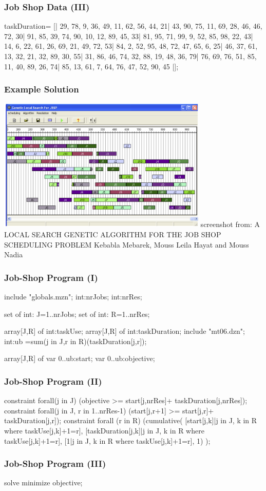 \begin{frame}[fragile]
  \frametitle{Job Shop Data (III)}
    \begin{semiverbatim}
taskDuration= [|
	29, 78,  9, 36, 49, 11, 62, 56, 44, 21|
	43, 90, 75, 11, 69, 28, 46, 46, 72, 30|
	91, 85, 39, 74, 90, 10, 12, 89, 45, 33|
	81, 95, 71, 99,  9, 52, 85, 98, 22, 43|
	14,  6, 22, 61, 26, 69, 21, 49, 72, 53|
	84,  2, 52, 95, 48, 72, 47, 65,  6, 25|
	46, 37, 61, 13, 32, 21, 32, 89, 30, 55|
	31, 86, 46, 74, 32, 88, 19, 48, 36, 79|
	76, 69, 76, 51, 85, 11, 40, 89, 26, 74|
	85, 13, 61,  7, 64, 76, 47, 52, 90, 45 |];
    \end{semiverbatim}
\end{frame}

\begin{frame}
  \frametitle{Example Solution}
  \includegraphics[width=10cm]{ft10}
  {\scriptsize screenshot from:
  A LOCAL SEARCH GENETIC ALGORITHM FOR THE JOB SHOP SCHEDULING PROBLEM
Kebabla Mebarek, Mouss Leila Hayat and Mouss Nadia}
\end{frame}


\begin{frame}[fragile]
  \frametitle{Job-Shop Program (I)}
  \begin{semiverbatim}
include "globals.mzn";
int:nrJobs;
int:nrRes;

set of int: J=1..nrJobs;
set of int: R=1..nrRes;

array[J,R] of int:taskUse;
array[J,R] of int:taskDuration;
include "mt06.dzn";
int:ub =sum(j in J,r in R)(taskDuration[j,r]);

array[J,R] of var 0..ub:start;
var 0..ub:objective;
  \end{semiverbatim}
\end{frame}

\begin{frame}[fragile]
  \frametitle{Job-Shop Program (II)}
  \begin{semiverbatim}
constraint forall(j in J) 
    (objective >= start[j,nrRes]+
                  taskDuration[j,nrRes]);
constraint forall(j in J, r in 1..nrRes-1)
    (start[j,r+1] >= start[j,r]+
                     taskDuration[j,r]);
constraint forall (r in R)
(cumulative(
  [start[j,k]|j in J, k in R
    where taskUse[j,k]+1=r],
  [taskDuration[j,k]|j in J, k in R
    where taskUse[j,k]+1=r],
  [1|j in J, k in R
    where taskUse[j,k]+1=r],
  1)
);
  \end{semiverbatim}
\end{frame}

\begin{frame}[fragile]
  \frametitle{Job-Shop Program (III)}
  \begin{semiverbatim}
solve minimize objective;
  \end{semiverbatim}
\end{frame}





